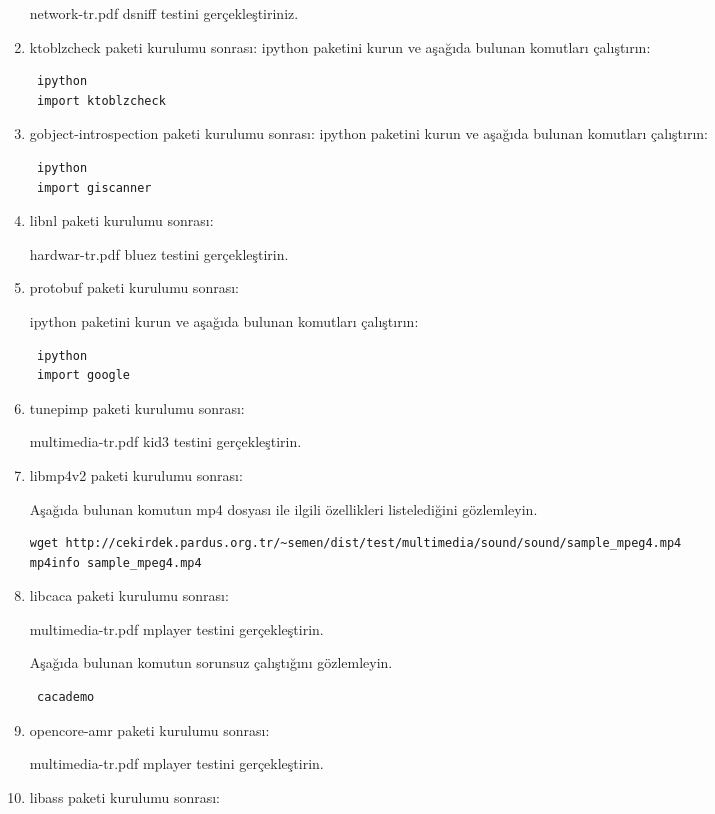 \documentclass[a4paper,10pt]{article}
\begin{document}
\begin{enumerate}
network-tr.pdf dsniff testini gerçekleştiriniz.

\item ktoblzcheck paketi kurulumu sonrası:
ipython paketini kurun ve aşağıda bulunan komutları çalıştırın:
\begin{verbatim}
 ipython
 import ktoblzcheck
\end{verbatim}


\item gobject-introspection paketi kurulumu sonrası:
ipython paketini kurun ve aşağıda bulunan komutları çalıştırın:
\begin{verbatim}
 ipython
 import giscanner
\end{verbatim}


\item libnl paketi kurulumu sonrası:

hardwar-tr.pdf bluez testini gerçekleştirin.
\item protobuf paketi kurulumu sonrası:

ipython paketini kurun ve aşağıda bulunan komutları çalıştırın:
\begin{verbatim}
 ipython
 import google
\end{verbatim}
\item tunepimp paketi kurulumu sonrası:

multimedia-tr.pdf kid3 testini gerçekleştirin.

\item libmp4v2 paketi kurulumu sonrası:

Aşağıda bulunan komutun mp4 dosyası ile ilgili özellikleri listelediğini gözlemleyin.
\begin{verbatim}
wget http://cekirdek.pardus.org.tr/~semen/dist/test/multimedia/sound/sound/sample_mpeg4.mp4
mp4info sample_mpeg4.mp4 
\end{verbatim}

\item libcaca paketi kurulumu sonrası:

multimedia-tr.pdf mplayer testini gerçekleştirin.

Aşağıda bulunan komutun sorunsuz çalıştığını gözlemleyin.
\begin{verbatim}
 cacademo
\end{verbatim}

\item opencore-amr paketi kurulumu sonrası:

multimedia-tr.pdf mplayer testini gerçekleştirin.

\item libass paketi kurulumu sonrası:


\end{enumerate}
\end{document}
